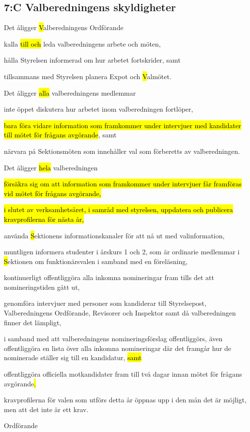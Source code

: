 \documentclass[../_main/handlingar.tex]{subfiles}
\begin{document}
\begin{attsatser}
        \subsection*{7:C Valberedningens skyldigheter}
        Det åligger \hl{V}alberedningens Ordförande
        \begin{attlist}
            \item kalla \hl{till och} leda valberedningens arbete och möten,
            \item hålla Styrelsen informerad om hur arbetet fortskrider, samt
            \item tillsammans med Styrelsen planera Expot och \hl{V}almötet.
        \end{attlist}
        Det åligger \hl{alla} valberedningens medlemmar
        \begin{attlist}
            \item inte öppet diskutera hur arbetet inom valberedningen fortlöper,
            \item \hl{bara föra vidare information som framkommer under intervjuer med kandidater till mötet för frågans avgörande}, samt
            \item närvara på Sektionsmöten som innehåller val som förberetts av valberedningen.
        \end{attlist}
        Det åligger \hl{hela} valberedningen
        \begin{attlist}
            \item \hl{försäkra sig om att information som framkommer under intervjuer får framföras vid mötet för frågans avgörande,}
            \item \hl{i slutet av verksamhetsåret, i samråd med styrelsen, uppdatera och publicera kravprofilerna för nästa år,}
            \item använda \hl{S}ektionens informationskanaler för att nå ut med valinformation,
            \item muntligen informera studenter i årskurs 1 och 2, som är ordinarie medlemmar i \hl{S}ektionen om funktionärsvalen i samband med en föreläsning,
            \item kontinuerligt offentliggöra alla inkomna nomineringar fram tills det att nomineringstiden gått ut,
            \item genomföra intervjuer med personer som kandiderar till Styrelsepost, Valberedningens Ordförande, Revisorer och Inspektor samt då valberedningen finner det lämpligt,
            \item i samband med att valberedningens nomineringsförslag offentliggörs, även offentliggöra en lista över alla inkomna nomineringar där det framgår hur de nominerade ställer sig till en kandidatur, \hl{samt}
            \item offentliggöra officiella motkandidater fram till två dagar innan mötet för frågans avgörande\hl{.}
        \end{attlist}

    \changenote

    \att kravprofilerna för valen som utförs detta år öppnas upp i den mån det är möjligt, men att det inte är ett krav.
\end{attsatser}

\begin{signatures}{1}
    \ist
    \signature{\ordf}{Ordförande}
\end{signatures}
\end{document}
